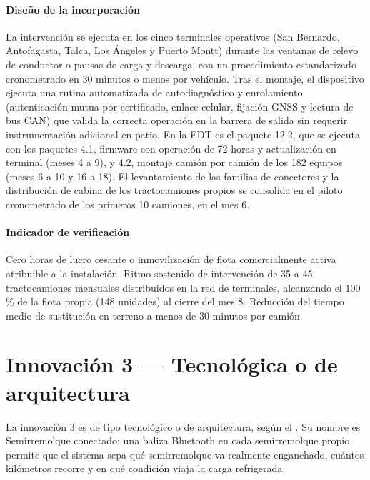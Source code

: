 \paragraph{Diseño de la incorporación} La intervención se ejecuta en los cinco terminales operativos
(San Bernardo, Antofagasta, Talca, Los Ángeles y Puerto Montt) durante las ventanas de relevo de
conductor o pausas de carga y descarga, con un procedimiento estandarizado cronometrado en 30 minutos o
menos por vehículo. Tras el montaje, el dispositivo ejecuta una rutina automatizada de autodiagnóstico
y enrolamiento (autenticación mutua por certificado, enlace celular, fijación GNSS y lectura de bus CAN) que valida la
correcta operación en la barrera de salida sin requerir instrumentación adicional en patio. En la EDT
es el paquete 12.2, que se ejecuta con los paquetes 4.1, firmware con operación de 72 horas y
actualización en terminal (meses 4 a 9), y 4.2, montaje camión por camión de los 182 equipos (meses 6 a
10 y 16 a 18). El levantamiento de las familias de conectores y la distribución de cabina de los
tractocamiones propios se consolida en el piloto cronometrado de los primeros 10 camiones, en el mes 6.

\paragraph{Indicador de verificación} Cero horas de lucro cesante o inmovilización de flota
comercialmente activa atribuible a la instalación. Ritmo sostenido de intervención de 35 a 45
tractocamiones mensuales distribuidos en la red de terminales, alcanzando el 100 \% de la flota propia
(148 unidades) al cierre del mes 8. Reducción del tiempo medio de sustitución en terreno a menos de
30 minutos por camión.


\section{Innovación 3 — Tecnológica o de arquitectura}\label{sec:13-innovacion-3}

La innovación 3 es de tipo tecnológico o de arquitectura, según el . Su nombre es
Semirremolque conectado: una baliza Bluetooth en cada semirremolque propio permite que el sistema sepa
qué semirremolque va realmente enganchado, cuántos kilómetros recorre y en qué condición viaja la carga
refrigerada.


